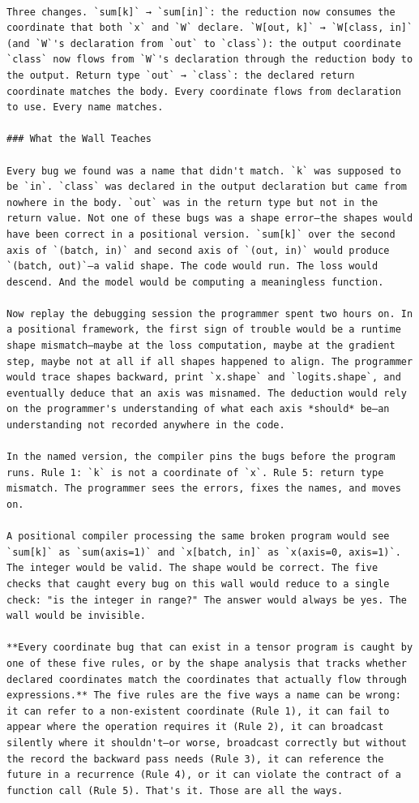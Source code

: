 \documentclass[11pt,titlepage]{article}
\begin{document}
\begin{verbatim}

Three changes. `sum[k]` → `sum[in]`: the reduction now consumes the coordinate that both `x` and `W` declare. `W[out, k]` → `W[class, in]` (and `W`'s declaration from `out` to `class`): the output coordinate `class` now flows from `W`'s declaration through the reduction body to the output. Return type `out` → `class`: the declared return coordinate matches the body. Every coordinate flows from declaration to use. Every name matches.

### What the Wall Teaches

Every bug we found was a name that didn't match. `k` was supposed to be `in`. `class` was declared in the output declaration but came from nowhere in the body. `out` was in the return type but not in the return value. Not one of these bugs was a shape error—the shapes would have been correct in a positional version. `sum[k]` over the second axis of `(batch, in)` and second axis of `(out, in)` would produce `(batch, out)`—a valid shape. The code would run. The loss would descend. And the model would be computing a meaningless function.

Now replay the debugging session the programmer spent two hours on. In a positional framework, the first sign of trouble would be a runtime shape mismatch—maybe at the loss computation, maybe at the gradient step, maybe not at all if all shapes happened to align. The programmer would trace shapes backward, print `x.shape` and `logits.shape`, and eventually deduce that an axis was misnamed. The deduction would rely on the programmer's understanding of what each axis *should* be—an understanding not recorded anywhere in the code.

In the named version, the compiler pins the bugs before the program runs. Rule 1: `k` is not a coordinate of `x`. Rule 5: return type mismatch. The programmer sees the errors, fixes the names, and moves on.

A positional compiler processing the same broken program would see `sum[k]` as `sum(axis=1)` and `x[batch, in]` as `x(axis=0, axis=1)`. The integer would be valid. The shape would be correct. The five checks that caught every bug on this wall would reduce to a single check: "is the integer in range?" The answer would always be yes. The wall would be invisible.

**Every coordinate bug that can exist in a tensor program is caught by one of these five rules, or by the shape analysis that tracks whether declared coordinates match the coordinates that actually flow through expressions.** The five rules are the five ways a name can be wrong: it can refer to a non-existent coordinate (Rule 1), it can fail to appear where the operation requires it (Rule 2), it can broadcast silently where it shouldn't—or worse, broadcast correctly but without the record the backward pass needs (Rule 3), it can reference the future in a recurrence (Rule 4), or it can violate the contract of a function call (Rule 5). That's it. Those are all the ways.


\end{verbatim}
\end{document}
